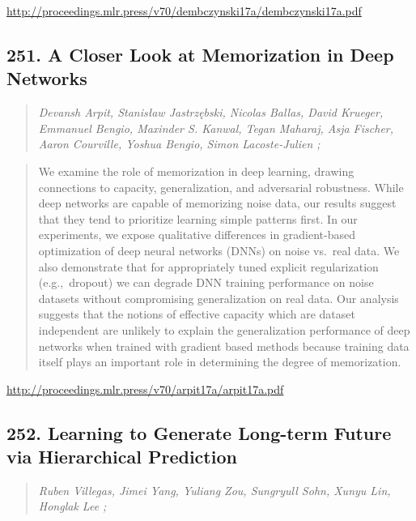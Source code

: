 \documentclass{article}
\begin{document}
\href{http://proceedings.mlr.press/v70/dembczynski17a/dembczynski17a.pdf}{http://proceedings.mlr.press/v70/dembczynski17a/dembczynski17a.pdf}

\subsection{251. A Closer Look at Memorization in Deep Networks}

\begin{quote}
\footnotesize{\textit{Devansh Arpit, Stanisław Jastrzębski, Nicolas Ballas, David Krueger, Emmanuel Bengio, Maxinder S. Kanwal, Tegan Maharaj, Asja Fischer, Aaron Courville, Yoshua Bengio, Simon Lacoste-Julien ;}}
\end{quote}

\begin{quote}
    We examine the role of memorization in deep learning, drawing connections to capacity, generalization, and adversarial robustness. While deep networks are capable of memorizing noise data, our results suggest that they tend to prioritize learning simple patterns first. In our experiments, we expose qualitative differences in gradient-based optimization of deep neural networks (DNNs) on noise vs.~real data. We also demonstrate that for appropriately tuned explicit regularization (e.g.,~dropout) we can degrade DNN training performance on noise datasets without compromising generalization on real data. Our analysis suggests that the notions of effective capacity which are dataset independent are unlikely to explain the generalization performance of deep networks when trained with gradient based methods because training data itself plays an important role in determining the degree of memorization.  \end{quote}

\href{http://proceedings.mlr.press/v70/arpit17a/arpit17a.pdf}{http://proceedings.mlr.press/v70/arpit17a/arpit17a.pdf}

\subsection{252. Learning to Generate Long-term Future via Hierarchical Prediction}

\begin{quote}
\footnotesize{\textit{Ruben Villegas, Jimei Yang, Yuliang Zou, Sungryull Sohn, Xunyu Lin, Honglak Lee ;}}
\end{quote}
\end{document}
